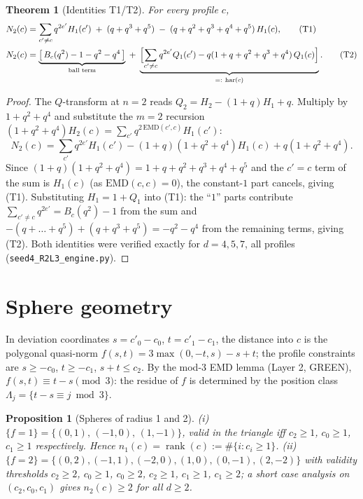 \documentclass[11pt]{article}
\newtheorem{theorem}{Theorem}
\newtheorem{proposition}{Proposition}
\newcommand{\EMD}{\mathrm{EMD}}
\begin{document}
\begin{theorem}[Identities T1/T2]\label{thm:T}
For every profile $c$,
\begin{align}
N_2(c) &= \sum_{c'\neq c} q^{2e'} H_1(c') \;+\; (q+q^3+q^5)
        \;-\; (q+q^2+q^3+q^4+q^5)\, H_1(c), \tag{T1}\\
N_2(c) &= \underbrace{\bigl[\,B_c(q^2) - 1 - q^2 - q^4\,\bigr]}_{\text{ball term}}
        \;+\; \underbrace{\Bigl[\sum_{c'\neq c} q^{2e'} Q_1(c')
        - q(1+q+q^2+q^3+q^4)\,Q_1(c)\Bigr]}_{=:~\mathrm{har}(c)}. \tag{T2}
\end{align}
\end{theorem}

\begin{proof}
The $Q$-transform at $n=2$ reads $Q_2 = H_2 - (1+q)H_1 + q$. Multiply by
$1+q^2+q^4$ and substitute the $m=2$ recursion
$(1+q^2+q^4)H_2(c) = \sum_{c'} q^{2\,\EMD(c',c)}H_1(c')$:
\[
N_2(c) = \sum_{c'} q^{2e'} H_1(c') - (1+q)(1+q^2+q^4)H_1(c) + q(1+q^2+q^4).
\]
Since $(1+q)(1+q^2+q^4) = 1+q+q^2+q^3+q^4+q^5$ and the $c'=c$ term of the
sum is $H_1(c)$ (as $\EMD(c,c)=0$), the constant-$1$ part cancels, giving
(T1). Substituting $H_1 = 1 + Q_1$ into (T1): the ``$1$'' parts contribute
$\sum_{c'\neq c} q^{2e'} = B_c(q^2)-1$ from the sum and
$-(q+\dots+q^5) + (q+q^3+q^5) = -q^2-q^4$ from the remaining terms,
giving (T2). Both identities were verified exactly for $d=4,5,7$, all
profiles (\texttt{seed4\_R2L3\_engine.py}).
\end{proof}

\section{Sphere geometry}

In deviation coordinates $s = c'_0 - c_0$, $t = c'_1 - c_1$, the distance
into $c$ is the polygonal quasi-norm $f(s,t) = 3\max(0,-t,s) - s + t$;
the profile constraints are $s\geq -c_0$, $t \geq -c_1$, $s+t \leq c_2$.
By the mod-3 EMD lemma (Layer 2, GREEN), $f(s,t) \equiv t-s \pmod 3$: the
residue of $f$ is determined by the position class
$\Lambda_j = \{t-s \equiv j \bmod 3\}$.

\begin{proposition}[Spheres of radius 1 and 2]\label{prop:spheres}
(i) $\{f=1\} = \{(0,1),\,(-1,0),\,(1,-1)\}$, valid in the triangle iff
$c_2\geq 1$, $c_0 \geq 1$, $c_1 \geq 1$ respectively. Hence
$n_1(c) = \operatorname{rank}(c) := \#\{i : c_i \geq 1\}$.
(ii) $\{f=2\} = \{(0,2),(-1,1),(-2,0),(1,0),(0,-1),(2,-2)\}$ with validity
thresholds $c_2\geq2$, $c_0\geq1$, $c_0\geq2$, $c_2\geq1$, $c_1\geq1$,
$c_1\geq2$; a short case analysis on $(c_2,c_0,c_1)$ gives $n_2(c)\geq 2$
for all $d\geq 2$.
\end{proposition}
\end{document}
